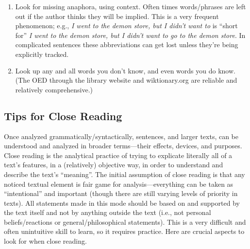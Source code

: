 \documentclass[12pt]{article}
\begin{document}
\begin{enumerate}
\item Look for missing anaphora, using context. Often times words/phrases are left out if the author thinks they will be implied. This is a very frequent phenomenon; e.g., \textit{I went to the demon store, but I didn’t want to} is ``short for'' \textit{I went to the demon store, but I didn’t want to go to the demon store}. In complicated sentences these abbreviations can get lost unless they’re being explicitly tracked.
\item Look up any and all words you don’t know, and even words you do know. (The OED through the library website and wiktionary.org are reliable and relatively comprehensive.)
\end{enumerate}

\subsection{Tips for Close Reading}

Once analyzed grammatically/syntactically, sentences, and larger texts, can be understood and analyzed in broader terms—their effects, devices, and purposes. Close reading is the analytical practice of trying to explicate literally all of a text’s features, in a (relatively) objective way, in order to understand and describe the text’s ``meaning''. The initial assumption of close reading is that any noticed textual element is fair game for analysis—everything can be taken as ``intentional'' and important (though there are still varying levels of priority in texts). All statements made in this mode should be based on and supported by the text itself and not by anything outside the text (i.e., not personal beliefs/reactions or general/philosophical statements). This is a very difficult and often unintuitive skill to learn, so it requires practice. Here are crucial aspects to look for when close reading.
\end{document}
